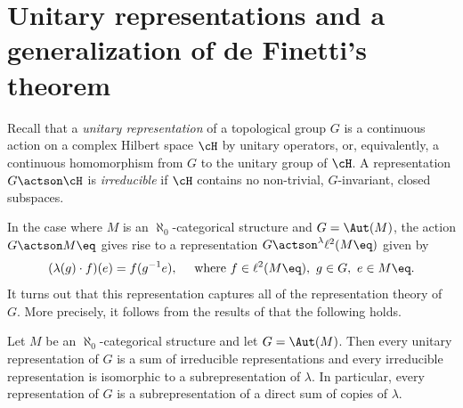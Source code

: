 \section{Unitary representations and a generalization of de Finetti's theorem}
\label{sec:general-de-finett}

Recall that a \emph{unitary representation} of a topological group $G$ is a continuous action on a complex Hilbert space $\cH$ by unitary operators, or, equivalently, a continuous homomorphism from $G$ to the unitary group of $\cH$. A representation $G \actson \cH$ is \emph{irreducible} if $\cH$ contains no non-trivial, $G$-invariant, closed subspaces.

In the case where $M$ is an $\aleph_0$-categorical structure and $G = \Aut(M)$, the action $G \actson M\eq$ gives rise to a representation $G \actson^\lambda \ell^2(M\eq)$ given by
\begin{equation*}
(\lambda(g) \cdot f)(e) = f(g^{-1} e), \quad \text{ where } f \in \ell^2(M\eq),\ g \in G,\ e \in M\eq.
\end{equation*}
It turns out that this representation captures all of the representation theory of $G$. More precisely, it follows from the results of \cite{Tsankov2012} that the following holds.
\begin{fact}
\label{f:representations}
Let $M$ be an $\aleph_0$-categorical structure and let $G = \Aut(M)$. Then every unitary representation of $G$ is a sum of irreducible representations and every irreducible representation is isomorphic to a subrepresentation of $\lambda$. In particular, every representation of $G$ is a subrepresentation of a direct sum of copies of $\lambda$.
\end{fact}
